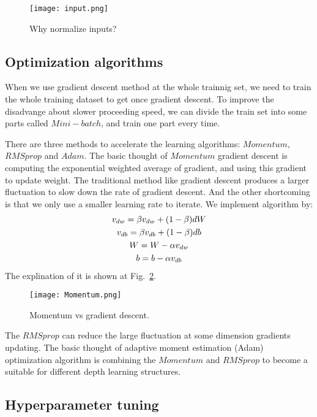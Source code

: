 \documentclass[a4paper]{article}
\begin{document}
\begin{figure}
\begin{center}
\texttt{[image: input.png]}
\end{center}
\caption{Why normalize inputs?}
\label{fig4}
\end{figure}

\subsection{Optimization algorithms}

When we use gradient descent method at the whole trainnig set, we need to train the whole training dataset to get once gradient descent. To improve the disadvange about slower proceeding speed, we can divide the train set into some parts called $Mini-batch$, and train one part every time.

There are three methods to accelerate the learning algorithms: $Momentum$, $RMSprop$ and $Adam$. The basic thought of $Momentum$ gradient descent is computing the exponential weighted average of gradient, and using this gradient to update weight. The traditional method like gradient descent produces a larger fluctuation to slow down the rate of gradient descent. And the other shortcoming is that we only use a smaller learning rate to iterate. We implement algorithm by:\\
\begin{gather}
v_{dw} = \beta v_{dw} + (1 - \beta)dW \\ \notag
v_{db} = \beta v_{db} + (1 - \beta)db \\ \notag
W = W - \alpha v_{dw}\\ \notag
b = b - \alpha v_{db}
\end{gather}
The explination of it is shown at Fig.~\ref{fig5}.
 
 \begin{figure}[hb]
 \begin{center}
 \texttt{[image: Momentum.png]}
 \end{center}
 \caption{Momentum vs gradient descent.}
 \label{fig5} 
 \end{figure}

 The $RMSprop$ can reduce the large fluctuation at some dimension gradients updating. The basic thought of adaptive moment estimation (Adam) optimization algorithm is combining the $Momentum$ and $RMSprop$ to become a suitable for different depth learning structures.

 \subsection{Hyperparameter tuning}
\end{document}
